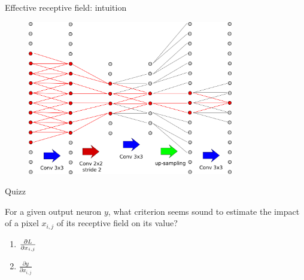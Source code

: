 \documentclass[xcolor=pdftex,dvipsnames,table,mathserif]{beamer}
\begin{document}
\begin{frame}{Effective receptive field: intuition}

  \begin{figure}
    \includegraphics[width=0.8\textwidth]{receptive_field3.png}
  \end{figure}

\end{frame}

\begin{frame}{Quizz}

  \begin{quizzblock}{For a given output neuron $y$, what criterion seems sound to estimate the impact of a pixel $x_{i,j}$ of its receptive field on its value?}
    \begin{enumerate}
    \item $\frac{\partial L}{\partial x_{i,j}}$
    \item $\frac{\partial y}{\partial x_{i,j}}$
    \end{enumerate}

  \end{quizzblock}

\end{frame}
\end{document}
